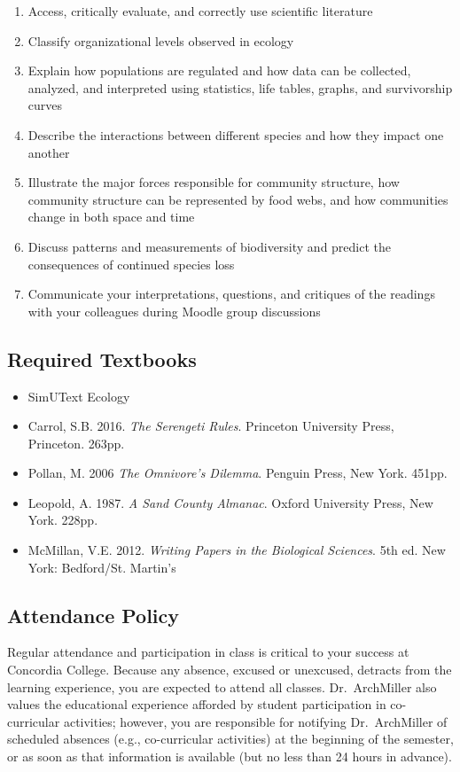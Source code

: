 \documentclass{tufte-handout}
\begin{document}
\begin{fullwidth}
\begin{enumerate}
	\item Access, critically evaluate, and correctly use scientific literature
	\item Classify organizational levels observed in ecology
	\item Explain how populations are regulated and how data can be collected, analyzed, and interpreted using statistics, life tables, graphs, and survivorship curves
	\item Describe the interactions between different species and how they impact one another
	\item Illustrate the major forces responsible for community structure, how community structure can be represented by food webs, and how communities change in both space and time
	\item Discuss patterns and measurements of biodiversity and predict the consequences of continued species loss
	\item Communicate your interpretations, questions, and critiques of the readings with your colleagues during Moodle group discussions
\end{enumerate}

\subsection{Required Textbooks}

\begin{itemize}
	\item SimUText Ecology
	\item Carrol, S.B. 2016. \emph{The Serengeti Rules}. Princeton University Press, Princeton. 263pp.
	\item Pollan, M. 2006 \emph{The Omnivore's Dilemma}. Penguin Press, New York. 451pp.
	\item Leopold, A. 1987. \emph{A Sand County Almanac}. Oxford University Press, New York. 228pp.
	\item McMillan, V.E. 2012. \emph{Writing Papers in the Biological Sciences}. 5th ed. New York: Bedford/St. Martin's
\end{itemize}

\subsection{Attendance Policy}

Regular attendance and participation in class is critical to your success at Concordia College. Because any absence, excused or unexcused, detracts from the learning experience, you are expected to attend all classes. Dr.~ArchMiller also values the educational experience afforded by student participation in co-curricular activities; however, you are responsible for notifying Dr.~ArchMiller of scheduled absences (e.g., co-curricular activities) at the beginning of the semester, or as soon as that information is available (but no less than 24 hours in advance). 


\end{fullwidth}
\end{document}
